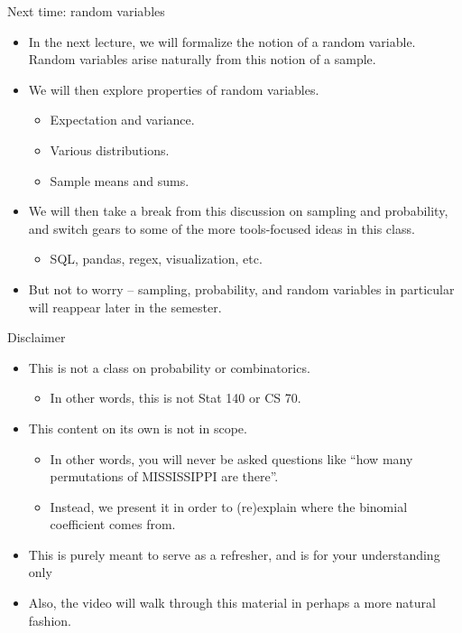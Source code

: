 \documentclass[aspectratio=169]{../latex_main/tntbeamer}  %
\begin{document}
	
	\begin{frame}{Next time: random variables}
    	\begin{itemize}
    	    \item In the next lecture, we will formalize the notion of a random variable. Random variables arise naturally from this notion of a sample.
    	    \item We will then explore properties of random variables. 
    	    \begin{itemize}
    	        \item Expectation and variance.
    	        \item Various distributions.
    	        \item Sample means and sums.
    	    \end{itemize}
    	    \item We will then take a break from this discussion on sampling and probability, and switch gears to some of the more tools-focused ideas in this class. 
    	    \begin{itemize}
    	        \item SQL, pandas, regex, visualization, etc.
    	    \end{itemize}
    	    \item But not to worry – sampling, probability, and random variables in particular will reappear later in the semester.
    	\end{itemize}

	\end{frame}
	
	
	\begin{frame}{Disclaimer}
	    \begin{itemize}
	        \item This is not a class on probability or combinatorics. 
	        \begin{itemize}
	            \item In other words, this is not Stat 140 or CS 70.
	        \end{itemize}
	        \item This content on its own is not in scope.
	        \begin{itemize}
	            \item In other words, you will never be asked questions like “how many permutations of MISSISSIPPI are there”.
	            \item Instead, we present it in order to (re)explain where the binomial coefficient comes from.
	        \end{itemize}
	        \item This is purely meant to serve as a refresher, and is for your understanding only
	        \item Also, the video will walk through this material in perhaps a more natural fashion.
	    \end{itemize}
	\end{frame}
	
\end{document}
